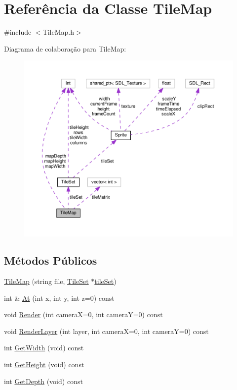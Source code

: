 \hypertarget{classTileMap}{\section{Referência da Classe Tile\+Map}
\label{classTileMap}
}


{\ttfamily \#include $<$Tile\+Map.\+h$>$}



Diagrama de colaboração para Tile\+Map\+:
\nopagebreak
\begin{figure}[H]
\begin{center}
\leavevmode
\includegraphics[width=350pt]{classTileMap__coll__graph}
\end{center}
\end{figure}
\subsection*{Métodos Públicos}
\begin{DoxyCompactItemize}
\item 
\hyperlink{classTileMap_acf6fe3a182047153ec9c25fadc55056c}{Tile\+Map} (string file, \hyperlink{classTileSet}{Tile\+Set} $\ast$\hyperlink{classTileMap_a24b2ea7aecfd795f1e13dfa9b0b3cb76}{tile\+Set})
\item 
int \& \hyperlink{classTileMap_a3b8dec192ee9ccca2b4476821235cc0a}{At} (int x, int y, int z=0) const 
\item 
void \hyperlink{classTileMap_a7ec4f6245f0e772c256f5b9240ce67ee}{Render} (int camera\+X=0, int camera\+Y=0) const 
\item 
void \hyperlink{classTileMap_a08748800b6fb6bd307acd3693a39d679}{Render\+Layer} (int layer, int camera\+X=0, int camera\+Y=0) const 
\item 
int \hyperlink{classTileMap_a072dbe1dbd793712baefe154c3058ab2}{Get\+Width} (void) const 
\item 
int \hyperlink{classTileMap_a9fe48260088655aa252b4d40e60f1390}{Get\+Height} (void) const 
\item 
int \hyperlink{classTileMap_aeb8c6a4101e449c33d963041345d918e}{Get\+Depth} (void) const 
\end{DoxyCompactItemize}
